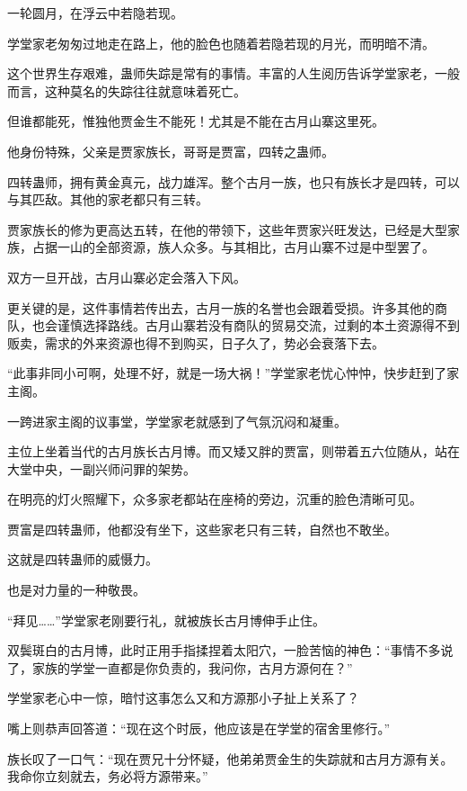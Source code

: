 
\begin{this_body}

一轮圆月，在浮云中若隐若现。

学堂家老匆匆过地走在路上，他的脸色也随着若隐若现的月光，而明暗不清。

这个世界生存艰难，蛊师失踪是常有的事情。丰富的人生阅历告诉学堂家老，一般而言，这种莫名的失踪往往就意味着死亡。

但谁都能死，惟独他贾金生不能死！尤其是不能在古月山寨这里死。

他身份特殊，父亲是贾家族长，哥哥是贾富，四转之蛊师。

四转蛊师，拥有黄金真元，战力雄浑。整个古月一族，也只有族长才是四转，可以与其匹敌。其他的家老都只有三转。

贾家族长的修为更高达五转，在他的带领下，这些年贾家兴旺发达，已经是大型家族，占据一山的全部资源，族人众多。与其相比，古月山寨不过是中型罢了。

双方一旦开战，古月山寨必定会落入下风。

更关键的是，这件事情若传出去，古月一族的名誉也会跟着受损。许多其他的商队，也会谨慎选择路线。古月山寨若没有商队的贸易交流，过剩的本土资源得不到贩卖，需求的外来资源也得不到购买，日子久了，势必会衰落下去。

“此事非同小可啊，处理不好，就是一场大祸！”学堂家老忧心忡忡，快步赶到了家主阁。

一跨进家主阁的议事堂，学堂家老就感到了气氛沉闷和凝重。

主位上坐着当代的古月族长古月博。而又矮又胖的贾富，则带着五六位随从，站在大堂中央，一副兴师问罪的架势。

在明亮的灯火照耀下，众多家老都站在座椅的旁边，沉重的脸色清晰可见。

贾富是四转蛊师，他都没有坐下，这些家老只有三转，自然也不敢坐。

这就是四转蛊师的威慑力。

也是对力量的一种敬畏。

“拜见……”学堂家老刚要行礼，就被族长古月博伸手止住。

双鬓斑白的古月博，此时正用手指揉捏着太阳穴，一脸苦恼的神色：“事情不多说了，家族的学堂一直都是你负责的，我问你，古月方源何在？”

学堂家老心中一惊，暗忖这事怎么又和方源那小子扯上关系了？

嘴上则恭声回答道：“现在这个时辰，他应该是在学堂的宿舍里修行。”

族长叹了一口气：“现在贾兄十分怀疑，他弟弟贾金生的失踪就和古月方源有关。我命你立刻就去，务必将方源带来。”


\end{this_body}
